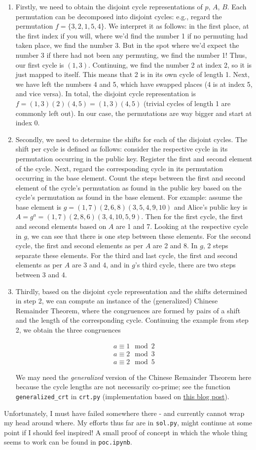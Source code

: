 \documentclass{article}
\begin{document}
\begin{enumerate}
    \item Firstly, we need to obtain the disjoint cycle representations of $p$, $A$, $B$. Each permutation can be decomposed into disjoint cycles: e.g., regard the permutation $f = \{3, 2, 1, 5, 4\}$. We interpret it as follows: in the first place, at the first index if you will, where we'd find the number 1 if no permuting had taken place, we find the number 3. But in the spot where we'd expect the number 3 if there had not been any permuting, we find the number 1! Thus, our first cycle is $(1, 3)$. Continuing, we find the number 2 at index 2, so it is just mapped to itself. This means that 2 is in its own cycle of length 1. Next, we have left the numbers 4 and 5, which have swapped places (4 is at index 5, and vice versa). In total, the disjoint cycle representation is $f = (1,3)(2)(4,5) = (1,3)(4,5)$ (trivial cycles of length 1 are commonly left out). In our case, the permutations are way bigger and start at index 0.
    \item Secondly, we need to determine the shifts for each of the disjoint cycles. The shift per cycle is defined as follows: consider the respective cycle in its permutation occurring in the public key. Register the first and second element of the cycle. Next, regard the corresponding cycle in its permutation occurring in the base element. Count the steps between the first and second element of the cycle's permutation as found in the public key based on the cycle's permutation as found in the base element. For example: assume the base element is $g = (1,7)(2,6,8)(3,5,4,9,10)$ and Alice's public key is $A = g^a = (1,7)(2,8,6)(3,4,10,5,9)$. Then for the first cycle, the first and second elements based on $A$ are 1 and 7. Looking at the respective cycle in $g$, we can see that there is one step between these elements. For the second cycle, the first and second elements as per $A$ are 2 and 8. In $g$, 2 steps separate these elements. For the third and last cycle, the first and second elements as per $A$ are 3 and 4, and in $g$'s third cycle, there are two steps between 3 and 4.
    \item Thirdly, based on the disjoint cycle representation and the shifts determined in step 2, we can compute an instance of the (generalized) Chinese Remainder Theorem, where the congruences are formed by pairs of a shift and the length of the corresponding cycle. Continuing the example from step 2, we obtain the three congruences
    
    \begin{align*}
        a \equiv 1 \mod 2 \\
        a \equiv 2 \mod 3 \\
        a \equiv 2 \mod 5
    \end{align*}

    We may need the \emph{generalized} version of the Chinese Remainder Theorem here because the cycle lengths are not necessarily co-prime; see the function \texttt{generalized\_crt} in \texttt{crt.py} (implementation based on \href{https://forthright48.com/chinese-remainder-theorem-part-2-non-coprime-moduli/}{this blog post}).

\end{enumerate}

Unfortunately, I must have failed somewhere there - and currently cannot wrap my head around where. My efforts thus far are in \texttt{sol.py}, might continue at some point if I should feel inspired! A small proof of concept in which the whole thing seems to work can be found in \texttt{poc.ipynb}.
\end{document}
